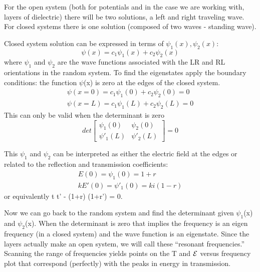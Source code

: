 For the open system (both for potentials and in the case we are working with, layers of dielectric) there will be two solutions, a left and right traveling wave.  For closed systems there is one solution (composed of two waves - standing wave).

Closed system solution can be expressed in terms of $\psi _1(x), \psi _2(x)$:
\begin{equation}
\psi (x) = c_1  \psi _1(x) + c_2  \psi _2(x)
\end{equation}
where $\psi _1$ and $ \psi  _2 $ are the wave functions associated with the LR and RL orientations in the random system. To find the eigenstates apply the boundary conditions: the function $\psi$(x) is zero at the edges of the closed system. 
\begin{equation}
\begin{gathered}
\psi (x=0) = c_1  \psi _1(0) + c_2  \psi _2(0) = 0 \\
\psi (x=L) = c_1  \psi _1(L) + c_2  \psi _2(L) = 0
\end{gathered}
\end{equation}
This can only be valid when the determinant is zero
\begin{equation}
det
\begin{bmatrix}
\psi _1(0) & \psi _2(0) \\
\psi ' _1(L) & \psi ' _2(L) 
\end{bmatrix}
 = 0
\end{equation}

This $ \psi _1 $ and $ \psi _2 $ can be interpreted as either the electric field at the edges or related to the reflection and transmission coefficients:
\begin{equation} %
\begin{gathered}
E(0) =  \psi _1 (0) = 1+r \\
k E'(0) = \psi ' _1 (0) = k i (1-r)
\end{gathered}
\end{equation}
or equivalently t t' - (1+r) (1+r') = 0. %

Now we can go back to the random system and find the determinant given $\psi  _1$(x) and $\psi _2 $(x). When the determinant is zero that implies the frequency is an eigen frequency (in a closed system) and the wave function is an eigenstate.  Since the layers actually make an open system, we will call these ``resonant frequencies.'' Scanning the range of frequencies yields points on the T and ${\cal E}$ versus frequency plot that correspond (perfectly) with the peaks in energy in transmission.


